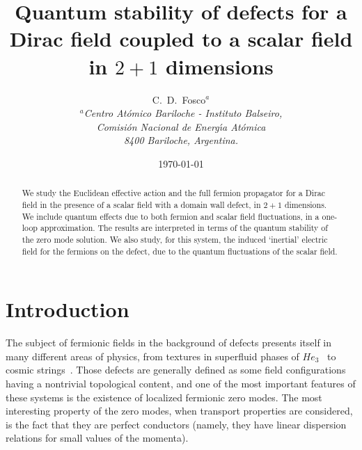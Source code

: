 \documentclass[a4paper,12pt]{article}
\begin{document}
\title{Quantum stability of defects for a Dirac field 
coupled to a scalar field in $2+1$ dimensions} 
\author{C.~D.~Fosco$^a$
  \\
  {\normalsize\it $^a$Centro At{\'o}mico Bariloche - Instituto Balseiro,}\\
  {\normalsize\it Comisi{\'o}n Nacional de Energ{\'\i}a At{\'o}mica}\\
  {\normalsize\it 8400 Bariloche, Argentina.}}  
\date{\today}
\maketitle
\begin{abstract}
\noindent We study the Euclidean effective action and the
full fermion propagator for a Dirac field in the presence of a scalar
field with a domain wall defect, in $2+1$ dimensions. We include
quantum effects due to both fermion and scalar field fluctuations, 
in a one-loop approximation. The results are interpreted in terms of
the quantum stability of the zero mode solution. We also study, for
this system, the induced `inertial' electric field for the fermions
on the defect, due to the quantum fluctuations of the scalar field.
\end{abstract}
\bigskip
\newpage
\section{Introduction}\label{intro}
The subject of fermionic fields in the background of defects presents
itself in many different areas of physics, from textures in superfluid
phases of $He_3$~\cite{he3} to cosmic strings~\cite{cosmic}. Those
defects are generally defined as some field configurations having a
nontrivial topological content, and one of the most important features
of these systems is the existence of localized fermionic zero modes.
The most interesting property of the zero modes, when transport
properties are considered, is the fact that they are perfect
conductors (namely, they have linear dispersion relations for small
values of the momenta).
\end{document}

